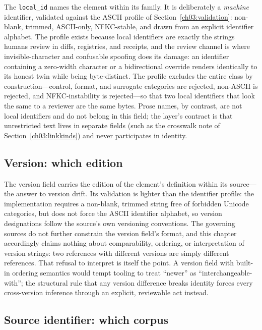 The \texttt{local\_id} names the element within its family. It is
deliberately a \emph{machine} identifier, validated against the
ASCII profile of Section~\ref{ch03:validation}: non-blank, trimmed,
ASCII-only, NFKC-stable, and drawn from an explicit identifier
alphabet. The profile exists because local identifiers are exactly
the strings humans review in diffs, registries, and receipts, and
the review channel is where invisible-character and confusable
spoofing does its damage: an identifier containing a zero-width
character or a bidirectional override renders identically to its
honest twin while being byte-distinct. The profile excludes the
entire class by construction---control, format, and surrogate
categories are rejected, non-ASCII is rejected, and
NFKC-instability is rejected---so that two local identifiers that
look the same to a reviewer are the same bytes. Prose names, by
contrast, are not local identifiers and do not belong in this
field; the layer's contract is that unrestricted text lives in
separate fields (such as the crosswalk note of
Section~\ref{ch03:linkkinds}) and never participates in identity.

\subsection{Version: which edition}\label{ch03:field-version}

The version field carries the edition of the element's definition
within its source---the answer to version drift. Its validation is
lighter than the identifier profile: the implementation requires a
non-blank, trimmed string free of forbidden Unicode categories, but
does not force the ASCII identifier alphabet, so version
designations follow the source's own versioning conventions. The
governing sources do not further constrain the version field's
format, and this chapter accordingly claims nothing about
comparability, ordering, or interpretation of version strings: two
references with different versions are simply different references.
That refusal to interpret is itself the point. A version field with
built-in ordering semantics would tempt tooling to treat
``newer'' as ``interchangeable-with''; the structural rule that any
version difference breaks identity forces every cross-version
inference through an explicit, reviewable act instead.

\subsection{Source identifier: which corpus}\label{ch03:field-sourceid}

